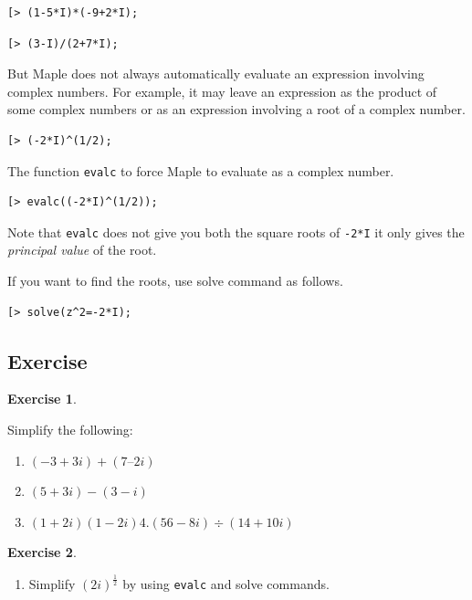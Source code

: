 \documentclass[
]{book}
\providecommand{\tightlist}{%
  \setlength{\itemsep}{0pt}\setlength{\parskip}{0pt}}
\theoremstyle{definition}
\theoremstyle{definition}
\theoremstyle{definition}
\newtheorem{exercise}{Exercise}[chapter]
\theoremstyle{definition}
\theoremstyle{remark}
\begin{document}
\begin{verbatim}
[> (1-5*I)*(-9+2*I);
\end{verbatim}

\begin{verbatim}
[> (3-I)/(2+7*I);
\end{verbatim}

But Maple does not always automatically evaluate an expression involving complex numbers.
For example, it may leave an expression as the product of some complex numbers or as an expression involving a root of a complex number.

\begin{verbatim}
[> (-2*I)^(1/2);
\end{verbatim}

The function \texttt{evalc} to force Maple to evaluate as a complex number.

\begin{verbatim}
[> evalc((-2*I)^(1/2));
\end{verbatim}

Note that \texttt{evalc} does not give you both the square roots of \texttt{-2*I} it only gives the \emph{principal value} of the root.

If you want to find the roots, use solve command as follows.

\begin{verbatim}
[> solve(z^2=-2*I);
\end{verbatim}

\subsection{Exercise}\label{exercise-1}

\begin{exercise}
\protect\hypertarget{exr:unnamed-chunk-10}{}\label{exr:unnamed-chunk-10}

Simplify the following:

\begin{enumerate}
\def\labelenumi{\arabic{enumi}.}
\tightlist
\item
  \((−3 + 3i) + (7 – 2i)\)
\item
  \((5 + 3i) − (3 − i)\)
\item
  \((1 + 2i)(1 − 2i) 4. (56 − 8i) ÷ (14 + 10i)\)
\end{enumerate}

\end{exercise}

\begin{exercise}
\protect\hypertarget{exr:unnamed-chunk-11}{}\label{exr:unnamed-chunk-11}\leavevmode

\begin{enumerate}
\def\labelenumi{\arabic{enumi}.}
\setcounter{enumi}{1}
\tightlist
\item
  Simplify \((2i)^\frac{1}{2}\) by using \texttt{evalc} and solve commands.
\end{enumerate}

\end{exercise}
\end{document}
